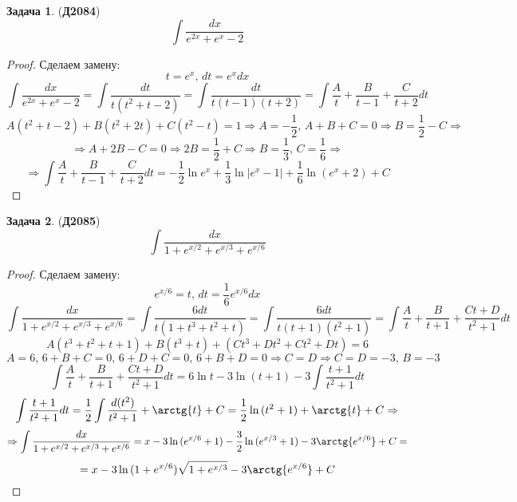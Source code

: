 \documentclass[12pt]{article}
\theoremstyle{definition}
\newtheorem{problem}{Задача}
\DeclareMathOperator{\dint}{\displaystyle\int}
\begin{document}
\begin{problem}(\textbf{Д2084})
	$$
		\dint \dfrac{dx}{e^{2x} + e^x - 2}
	$$
\end{problem}
\begin{proof}
	Сделаем замену:
	$$
		t = e^x, \, dt = e^x dx
	$$
	$$
		\dint \dfrac{dx}{e^{2x} + e^x - 2} = \dint \dfrac{dt}{t(t^2 + t  -2)} = \dint \dfrac{dt}{t(t - 1)(t + 2)} = \dint \dfrac{A}{t} + \dfrac{B}{t-1} + \dfrac{C}{t + 2}dt
	$$
	$$
		A(t^2 + t -2) + B(t^2 + 2t) + C(t^2 - t) = 1 \Rightarrow A = -\dfrac{1}{2}, \, A + B + C = 0 \Rightarrow B = \dfrac{1}{2} - C \Rightarrow
	$$
	$$
		\Rightarrow A + 2B - C = 0 \Rightarrow  2B = \dfrac{1}{2} + C \Rightarrow B = \dfrac{1}{3}, \, C = \dfrac{1}{6} \Rightarrow
	$$
	$$
		\Rightarrow \dint \dfrac{A}{t} + \dfrac{B}{t-1} + \dfrac{C}{t + 2}dt = -\dfrac{1}{2}\ln{e^x} + \dfrac{1}{3}\ln{|e^x - 1|} + \dfrac{1}{6}\ln{(e^x + 2)} + C
	$$
\end{proof}
\newpage
\begin{problem}(\textbf{Д2085})
	$$
		\dint \dfrac{dx}{1 + e^{x/2} + e^{x/3} + e^{x/6}}
	$$
\end{problem}
\begin{proof}
	Сделаем замену:
	$$
		e^{x/6} = t, \, dt  = \dfrac{1}{6}e^{x/6}dx
	$$
	$$
		\dint \dfrac{dx}{1 + e^{x/2} + e^{x/3} + e^{x/6}} = \dint \dfrac{6dt}{t(1 + t^3 + t^2 + t)} = \dint \dfrac{6dt}{t(t+1)(t^2 + 1)} = \dint \dfrac{A}{t} + \dfrac{B}{t+1} + \dfrac{Ct + D}{t^2 + 1}dt
	$$
	$$
		A(t^3 + t^2 + t + 1) + B(t^3 + t) + (Ct^3 + Dt^2 + Ct^2 + Dt) = 6
	$$	
	$$
		A = 6, \, 6 + B +C = 0, \, 6 + D + C = 0, \, 6 + B + D = 0 \Rightarrow C = D \Rightarrow C = D = -3, \, B = -3
	$$
	$$
		\dint \dfrac{A}{t} + \dfrac{B}{t+1} + \dfrac{Ct + D}{t^2 + 1}dt = 6\ln{t} - 3\ln{(t+1)}  - 3 \dint\dfrac{t + 1}{t^2+1}dt
	$$
	$$
		\dint\dfrac{t + 1}{t^2+1}dt = \dfrac{1}{2}\dint \dfrac{d(t^2)}{t^2 + 1} + \arctg{t} + C = \dfrac{1}{2}\ln{(t^2 + 1)} + \arctg{t} + C \Rightarrow
	$$
	$$
		\Rightarrow \dint \dfrac{dx}{1 + e^{x/2} + e^{x/3} + e^{x/6}} = x - 3\ln{(e^{x/6} + 1)} - \dfrac{3}{2}\ln{(e^{x/3} + 1)} - 3 \arctg{e^{x/6}} + C=
	$$
	$$
		=	x - 3\ln{(1 + e^{x/6})\sqrt{1 + e^{x/3}}} - 3 \arctg{e^{x/6}} + C
	$$
\end{proof}
\end{document}
